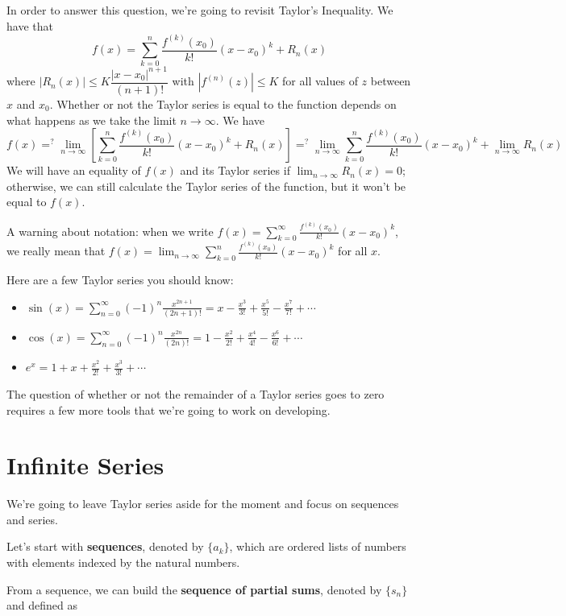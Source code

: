 \documentclass[
]{book}
\providecommand{\tightlist}{%
  \setlength{\itemsep}{0pt}\setlength{\parskip}{0pt}}
\theoremstyle{definition}
\theoremstyle{definition}
\theoremstyle{definition}
\theoremstyle{definition}
\theoremstyle{remark}
\begin{document}
In order to answer this question, we're going to revisit Taylor's Inequality. We have that \[f(x)=\sum_{k=0}^n\frac{f^{(k)}(x_0)}{k!}(x-x_0)^k+R_n(x)\] where \(|R_n(x)|\leq K \dfrac{|x-x_0|^{n+1}}{(n+1)!}\) with \(|f^{(n)}(z)|\leq K\) for all values of \(z\) between \(x\) and \(x_0\). Whether or not the Taylor series is equal to the function depends on what happens as we take the limit \(n\to\infty\). We have \[f(x)=^{?}\lim_{n\to\infty}\left [\sum_{k=0}^n\frac{f^{(k)}(x_0)}{k!}(x-x_0)^k+R_n(x) \right] =^? \lim_{n\to\infty}\sum_{k=0}^n\frac{f^{(k)}(x_0)}{k!}(x-x_0)^k + \lim_{n\to \infty}R_n(x)\]
We will have an equality of \(f(x)\) and its Taylor series if \(\displaystyle \lim_{n\to \infty}R_n(x)=0\); otherwise, we can still calculate the Taylor series of the function, but it won't be equal to \(f(x)\).

A warning about notation: when we write \(f(x)=\sum_{k=0}^\infty\frac{f^{(k)}(x_0)}{k!}(x-x_0)^k\), we really mean that \(f(x)=\lim_{n\to\infty}\sum_{k=0}^n\frac{f^{(k)}(x_0)}{k!}(x-x_0)^k\) for all \(x\).

Here are a few Taylor series you should know:

\begin{itemize}
\tightlist
\item
  \(\sin(x)=\sum_{n=0}^\infty (-1)^n \frac{x^{2n+1}}{(2n+1)!}=x-\frac{x^3}{3!}+\frac{x^5}{5!}-\frac{x^7}{7!}+\cdots\)
\item
  \(\cos(x)=\sum_{n=0}^\infty (-1)^n \frac{x^{2n}}{(2n)!}=1-\frac{x^2}{2!}+\frac{x^4}{4!}-\frac{x^6}{6!}+\cdots\)
\item
  \(e^x = 1+ x+ \frac{x^2}{2!}+\frac{x^3}{3!}+\cdots\)
\end{itemize}

The question of whether or not the remainder of a Taylor series goes to zero requires a few more tools that we're going to work on developing.

\hypertarget{infinite-series}{%
\section{Infinite Series}\label{infinite-series}}

We're going to leave Taylor series aside for the moment and focus on sequences and series.

Let's start with \textbf{sequences}, denoted by \(\{a_k\}\), which are ordered lists of numbers with elements indexed by the natural numbers.

From a sequence, we can build the \textbf{sequence of partial sums}, denoted by \(\{s_n\}\) and defined as
\end{document}

